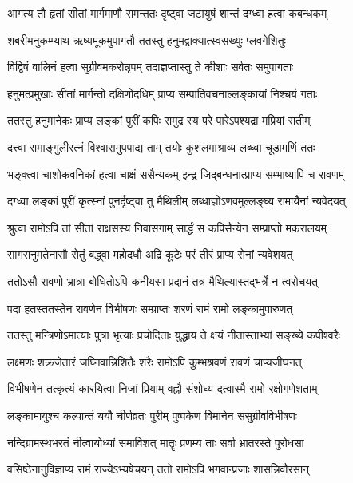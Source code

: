 \twolineshloka
{आगत्य तौ हृतां सीतां मार्गमाणौ समन्ततः}
{दृष्ट्वा जटायुषं शान्तं दग्ध्वा हत्वा कबन्धकम्}%

\twolineshloka
{शबरीमनुकम्प्याथ ऋष्यमूकमुपागतौ}
{ततस्तु हनुमद्वाक्यात्स्वसख्युः प्लवगेशितुः}%

\twolineshloka
{विद्विषं वालिनं हत्वा सुग्रीवमकरोन्नृपम्}
{तदाज्ञप्तास्तु ते कीशाः सर्वतः समुपागताः}%

\twolineshloka
{हनुमत्प्रमुखाः सीतां मार्गन्तो दक्षिणोदधिम्}
{प्राप्य सम्पातिवचनाल्लङ्कायां निश्चयं गताः}%

\twolineshloka
{ततस्तु हनुमानेकः प्राप्य लङ्कां पुरीं कपिः}
{समुद्र स्य परे पारेऽपश्यद्रा मप्रियां सतीम्}%

\twolineshloka
{दत्त्वा रामाङ्गुलीरत्नं विश्वासमुपपाद्य ताम्}
{तयोः कुशलमाश्राव्य लब्ध्वा चूडामणिं ततः}%

\twolineshloka
{भङ्क्त्वा चाशोकवनिकां हत्वा चाक्षं ससैन्यकम्}
{इन्द्र जिद्बन्धनात्प्राप्य सम्भाष्यापि च रावणम्}%

\twolineshloka
{दग्ध्वा लङ्कां पुरीं कृत्स्नां पुनर्दृष्ट्वा तु मैथिलीम्}
{लब्धाज्ञोऽणवमुल्लङ्घ्य रामायैनां न्यवेदयत्}%

\twolineshloka
{श्रुत्वा रामोऽपि तां सीतां राक्षसस्य निवासगाम्}
{सार्द्धं स कपिसैन्येन सम्प्राप्तो मकरालयम्}%

\twolineshloka
{सागरानुमतेनासौ सेतुं बद्ध्वा महोदधौ}
{अद्रि कूटेः परं तीरं प्राप्य सेनां न्यवेशयत्}%

\twolineshloka
{ततोऽसौ रावणो भ्रात्रा बोधितोऽपि कनीयसा}
{प्रदानं तत्र मैथिल्यास्तद्भर्त्रे न त्वरोचयत्}%

\twolineshloka
{पदा हतस्ततस्तेन रावणेन विभीषणः}
{सम्प्राप्तः शरणं रामं रामो लङ्कामुपारुणत्}%

\twolineshloka
{ततस्तु मन्त्रिणोऽमात्याः पुत्रा भृत्याः प्रचोदिताः}
{युद्धाय ते क्षयं नीतास्ताभ्यां सङ्ख्ये कपीश्वरैः}%

\twolineshloka
{लक्ष्मणः शक्रजेतारं जघ्निवान्निशितैः शरैः}
{रामोऽपि कुम्भश्रवणं रावणं चाप्यजीघनत्}%

\twolineshloka
{विभीषणेन तत्कृत्यं कारयित्वा निजां प्रियाम्}
{वह्नौ संशोध्य दत्वास्मै रामो रक्षोगणेशताम्}%

\twolineshloka
{लङ्कामायुश्च कल्पान्तं ययौ चीर्णव्रतः पुरीम्}
{पुष्पकेण विमानेन ससुग्रीवविभीषणः}%

\twolineshloka
{नन्दिग्रामस्थभरतं नीत्वायोध्यां समाविशत्}
{मातॄः प्रणम्य ताः सर्वा भ्रातरस्ते पुरोधसा}%

\twolineshloka
{वसिष्ठेनानुविज्ञाप्य रामं राज्येऽभ्यषेचयन्}
{ततो रामोऽपि भगवान्प्रजाः शासन्निवौरसान्}%


